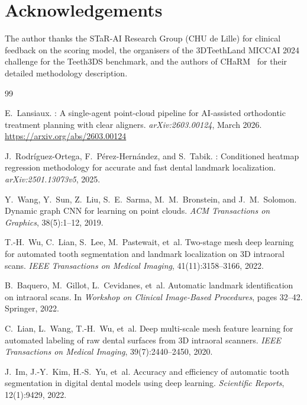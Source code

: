 \documentclass[10pt,twocolumn]{article}
\newcommand{\orthoai}{\textsc{OrthoAI}}
\begin{document}
\section*{Acknowledgements}
The author thanks the STaR-AI Research Group (CHU de Lille) for clinical
feedback on the scoring model, the organisers of the 3DTeethLand MICCAI 2024
challenge for the Teeth3DS benchmark, and the authors of
CHaRM~\cite{rodriguez2025charm} for their detailed methodology description.


\begin{thebibliography}{99}

E.~Lansiaux.
\newblock {\orthoai{} v1}: {A} single-agent point-cloud pipeline for
  {AI}-assisted orthodontic treatment planning with clear aligners.
\newblock \textit{arXiv:2603.00124}, March 2026.
\newblock \url{https://arxiv.org/abs/2603.00124}

J.~Rodríguez-Ortega, F.~Pérez-Hernández, and S.~Tabik.
: Conditioned heatmap regression methodology for accurate and
  fast dental landmark localization.
\newblock \textit{arXiv:2501.13073v5}, 2025.

Y.~Wang, Y.~Sun, Z.~Liu, S.~E.~Sarma, M.~M.~Bronstein, and J.~M.~Solomon.
\newblock Dynamic graph {CNN} for learning on point clouds.
\newblock \textit{ACM Transactions on Graphics}, 38(5):1--12, 2019.

T.-H.~Wu, C.~Lian, S.~Lee, M.~Pastewait, et~al.
\newblock Two-stage mesh deep learning for automated tooth segmentation and
  landmark localization on {3D} intraoral scans.
\newblock \textit{IEEE Transactions on Medical Imaging}, 41(11):3158--3166,
  2022.

B.~Baquero, M.~Gillot, L.~Cevidanes, et~al.
\newblock Automatic landmark identification on intraoral scans.
\newblock In \textit{Workshop on Clinical Image-Based Procedures}, pages
  32--42. Springer, 2022.

C.~Lian, L.~Wang, T.-H.~Wu, et~al.
\newblock Deep multi-scale mesh feature learning for automated labeling of
  raw dental surfaces from {3D} intraoral scanners.
\newblock \textit{IEEE Transactions on Medical Imaging}, 39(7):2440--2450,
  2020.

J.~Im, J.-Y.~Kim, H.-S.~Yu, et~al.
\newblock Accuracy and efficiency of automatic tooth segmentation in digital
  dental models using deep learning.
\newblock \textit{Scientific Reports}, 12(1):9429, 2022.


\end{thebibliography}
\end{document}
